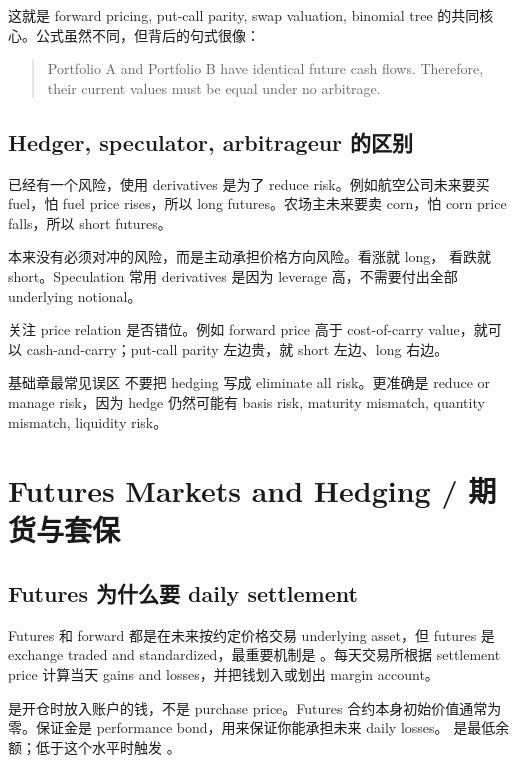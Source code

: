 这就是 forward pricing, put-call parity, swap valuation, binomial tree 的共同核心。公式虽然不同，但背后的句式很像：
\begin{quote}
Portfolio A and Portfolio B have identical future cash flows. Therefore, their current values must be equal under no arbitrage.
\end{quote}

\subsection{Hedger, speculator, arbitrageur 的区别}
 已经有一个风险，使用 derivatives 是为了 reduce risk。例如航空公司未来要买 fuel，怕 fuel price rises，所以 long futures。农场主未来要卖 corn，怕 corn price falls，所以 short futures。

 本来没有必须对冲的风险，而是主动承担价格方向风险。看涨就 long， 看跌就 short。Speculation 常用 derivatives 是因为 leverage 高，不需要付出全部 underlying notional。

 关注 price relation 是否错位。例如 forward price 高于 cost-of-carry value，就可以 cash-and-carry；put-call parity 左边贵，就 short 左边、long 右边。

\begin{warningbox}{基础章最常见误区}
不要把 hedging 写成 eliminate all risk。更准确是 reduce or manage risk，因为 hedge 仍然可能有 basis risk, maturity mismatch, quantity mismatch, liquidity risk。
\end{warningbox}

\section{Futures Markets and Hedging / 期货与套保}

\subsection{Futures 为什么要 daily settlement}
Futures 和 forward 都是在未来按约定价格交易 underlying asset，但 futures 是 exchange traded and standardized，最重要机制是 。每天交易所根据 settlement price 计算当天 gains and losses，并把钱划入或划出 margin account。

 是开仓时放入账户的钱，不是 purchase price。Futures 合约本身初始价值通常为零。保证金是 performance bond，用来保证你能承担未来 daily losses。 是最低余额；低于这个水平时触发 。


